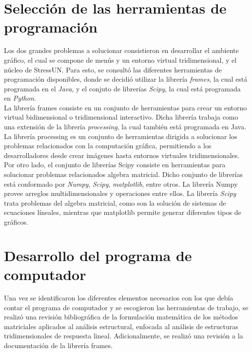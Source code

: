 \section{Selección de las herramientas de programación}
Los dos grandes problemas a solucionar consistieron en desarrollar el ambiente gráfico, el cual se compone de menús y un entorno virtual tridimensional, y el núcleo de StressUN. Para esto, se consultó las diferentes herramientas de programación disponibles, donde se decidió utilizar la librería \textit{frames}, la cual está programada en el \textit{Java}, y el conjuto de librerías \textit{Scipy}, la cual está programada en \textit{Python}.\\

La librería frames consiste en un conjunto de herramientas para crear un entorno virtual bidimensional o tridimensional interactivo. Dicha librería trabaja como una extensión de la librería \textit{processing}, la cual también está programada en Java. \\

La librería processing es un conjunto de herramientas dirigida a solucionar los problemas relacionados con la computación gráfica, permitiendo a los desarrolladores desde crear imágenes hasta entornos virtuales tridimensionales. \\

Por otro lado, el conjunto de librerías Scipy consiste en herramientas para solucionar problemas relacionados algebra matricial. Dicho conjunto de librerías está conformado por \textit{Numpy}, \textit{Scipy}, \textit{matplotlib}, entre otros. La librería Numpy provee arreglos multidimensionales y operaciones entre ellos. La librería \textit{Scipy} trata problemas del algebra matricial, como son la solución de sistemas de ecuaciones líneales, mientras que matplotlib permite generar diferentes tipos de gráficos. \\

\section{Desarrollo del programa de computador}

Una vez se identificaron los diferentes elementos necesarios con los que debía contar el programa de computador y se escogieron las herramientas de trabajo, se realizó una revisión bibliográfica de la formulación matemática de los métodos matriciales aplicados al análisis estructural, enfocada al análisis de estructuras tridimensionales de respuesta lineal. Adicionalmente, se realizó una revisión a la documentación de la librería frames.\\

